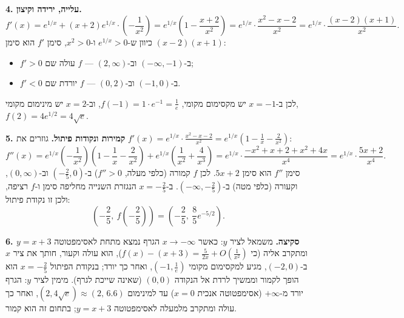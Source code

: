 \begin{solution}
\textbf{4. עלייה, ירידה וקיצון.}
\[ f'(x)=e^{1/x}+(x+2)e^{1/x}\cdot\left(-\frac{1}{x^2}\right)=e^{1/x}\left(1-\frac{x+2}{x^2}\right)=e^{1/x}\cdot\frac{x^2-x-2}{x^2}=e^{1/x}\cdot\frac{(x-2)(x+1)}{x^2}. \]
כיוון ש-$e^{1/x}>0$ ו-$x^2>0$, סימן $f'$ הוא סימן $(x-2)(x+1)$:
\begin{itemize}
  \item $f'>0$ ב-$(-\infty,-1)$ וב-$(2,\infty)$ — $f$ עולה שם;
  \item $f'<0$ ב-$(-1,0)$ וב-$(0,2)$ — $f$ יורדת שם.
\end{itemize}
לכן ב-$x=-1$ יש מקסימום מקומי, $f(-1)=1\cdot e^{-1}=\frac1e$, וב-$x=2$ יש מינימום מקומי, $f(2)=4e^{1/2}=4\sqrt e$.

\textbf{5. קמירות ונקודות פיתול.} גוזרים את $f'(x)=e^{1/x}\cdot\frac{x^2-x-2}{x^2}=e^{1/x}\left(1-\frac1x-\frac2{x^2}\right)$:
\[ f''(x)=e^{1/x}\left(-\frac1{x^2}\right)\left(1-\frac1x-\frac2{x^2}\right)+e^{1/x}\left(\frac1{x^2}+\frac4{x^3}\right)
=e^{1/x}\cdot\frac{-x^2+x+2+x^2+4x}{x^4}=e^{1/x}\cdot\frac{5x+2}{x^4}. \]
סימן $f''$ הוא סימן $5x+2$. לכן $f$ קמורה (כלפי מעלה, $f''>0$) ב-$\left(-\frac25,0\right)$ וב-$(0,\infty)$, וקעורה (כלפי מטה) ב-$\left(-\infty,-\frac25\right)$. ב-$x=-\frac25$ הנגזרת השנייה מחליפה סימן ו-$f$ רציפה, ולכן זו נקודת פיתול:
\[ \left(-\frac25,\ f\left(-\frac25\right)\right)=\left(-\frac25,\ \frac85e^{-5/2}\right). \]

\textbf{6. סקיצה.} משמאל לציר $y$: כאשר $x\to-\infty$ הגרף נמצא מתחת לאסימפטוטה $y=x+3$ ומתקרב אליה (כי $f(x)-(x+3)=\frac{5}{2x}+O\left(\frac1{x^2}\right)$), הוא עולה וקעור, חותך את ציר $x$ ב-$(-2,0)$, מגיע למקסימום מקומי $\left(-1,\frac1e\right)$, ואחר כך יורד; בנקודת הפיתול $x=-\frac25$ הוא הופך לקמור וממשיך לרדת אל הנקודה $(0,0)$ (שאינה שייכת לגרף). מימין לציר $y$: הגרף יורד מ-$+\infty$ (אסימפטוטה אנכית $x=0$) עד למינימום $(2,4\sqrt e)\approx(2,\,6.6)$, ואחר כך עולה ומתקרב מלמעלה לאסימפטוטה $y=x+3$; בתחום זה הוא קמור.
\end{solution}
